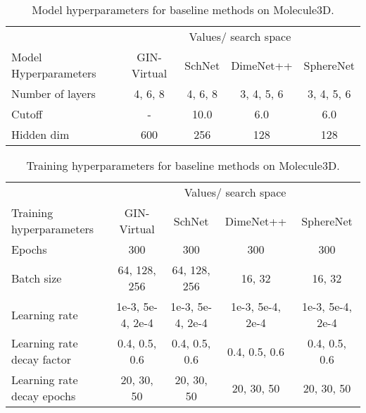 \documentclass{article}
\begin{document}
\begin{table*}[ht]
\begin{center}
\caption{Model hyperparameters for baseline methods on Molecule3D.}
\label{tb:baseline_model_hyperpara}
{\begin{tabular}{l|cccc}\toprule
&\multicolumn{4}{c}{Values/ search space} \\
\cmidrule(l{4pt}r{4pt}){2-5}
Model Hyperparameters & GIN-Virtual &SchNet &DimeNet++ & SphereNet\\
\midrule
Number of layers &4, 6, 8 &4, 6, 8 &3, 4, 5, 6 &3, 4, 5, 6 \\
Cutoff &- &10.0 &6.0 &6.0 \\
Hidden dim &600 &256 &128 &128 \\
\bottomrule
\end{tabular}}
\end{center}
\end{table*}

\begin{table}[!ht] \begin{center}
\caption{Training hyperparameters for baseline methods on Molecule3D.}
\label{tb:baseline_training_hyperpara}
{\begin{tabular}{l|cccc}\toprule
&\multicolumn{4}{c}{Values/ search space} \\
\cmidrule(l{4pt}r{4pt}){2-5}
Training hyperparameters  &GIN-Virtual &SchNet &DimeNet++ &SphereNet \\
\midrule
Epochs &300 &300 &300 &300 \\
Batch size &64, 128, 256 &64, 128, 256 &16, 32 &16, 32 \\
Learning rate & 1e-3, 5e-4, 2e-4 & 1e-3, 5e-4, 2e-4 &1e-3, 5e-4, 2e-4 &1e-3, 5e-4, 2e-4 \\
Learning rate decay factor &0.4, 0.5, 0.6 &0.4, 0.5, 0.6 &0.4, 0.5, 0.6 &0.4, 0.5, 0.6 \\
Learning rate decay epochs &20, 30, 50 &20, 30, 50 &20, 30, 50 &20, 30, 50 \\
\bottomrule
\end{tabular}}
\end{center}
\end{table}
\end{document}
